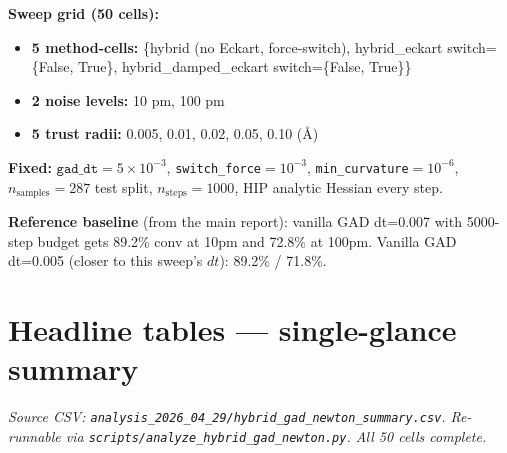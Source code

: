 \documentclass[11pt]{article}
\begin{document}
\textbf{Sweep grid (50 cells):}
\begin{itemize}[leftmargin=1.5em, itemsep=0.05em]
\item \textbf{5 method-cells:} \{hybrid (no Eckart, force-switch),
  hybrid\_eckart switch=\{False, True\}, hybrid\_damped\_eckart switch=\{False, True\}\}
\item \textbf{2 noise levels:} 10 pm, 100 pm
\item \textbf{5 trust radii:} 0.005, 0.01, 0.02, 0.05, 0.10 (Å)
\end{itemize}

\textbf{Fixed:} $\mathtt{gad\_dt}{=}5\!\times\!10^{-3}$,
\texttt{switch\_force}${=}10^{-3}$, \texttt{min\_curvature}${=}10^{-6}$,
$n_{\text{samples}}{=}287$ test split, $n_{\text{steps}}{=}1000$, HIP
analytic Hessian every step.

\textbf{Reference baseline} (from the main report): vanilla GAD
dt=0.007 with 5000-step budget gets 89.2\% conv at 10pm and 72.8\% at
100pm. Vanilla GAD dt=0.005 (closer to this sweep's $dt$): 89.2\% / 71.8\%.

\section{Headline tables — single-glance summary}

\textit{Source CSV: \texttt{analysis\_2026\_04\_29/hybrid\_gad\_newton\_summary.csv}.
Re-runnable via \texttt{scripts/analyze\_hybrid\_gad\_newton.py}. All 50 cells complete.}
\end{document}
